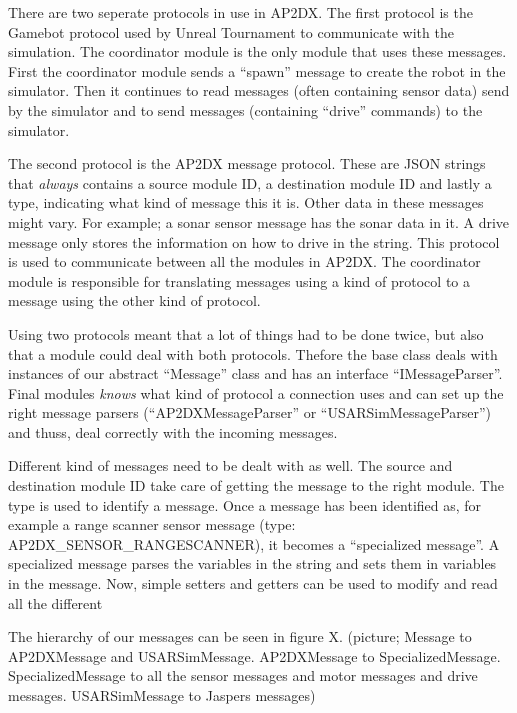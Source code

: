 There are two seperate protocols in use in AP2DX. The first protocol is the Gamebot protocol 
used by Unreal Tournament to communicate with the simulation. The coordinator module is the 
only module that uses these messages. First the coordinator module sends a ``spawn'' message 
to create the robot in the simulator. Then it continues to read messages (often containing 
sensor data) send by the simulator and to send messages (containing ``drive'' commands) to
the simulator. 

The second protocol is the AP2DX message protocol. These are JSON strings that \emph{always}
contains a source module ID, a destination module ID and lastly a type, indicating what kind
of message this it is. Other data in these messages might vary. For example; a sonar sensor
message has the sonar data in it. A drive message only stores the information on how to drive
in the string. 
This protocol is used to communicate between all the modules in 
AP2DX.  The coordinator module is responsible for translating messages using a kind of
protocol to a message using the other kind of protocol.

Using two protocols meant that a lot of things had to be done twice, but also that a module 
could deal with both protocols. Thefore the 
base class deals with instances
of our abstract ``Message'' class and has an interface ``IMessageParser''. Final modules \emph{knows}
what kind of protocol a connection uses and can set up the right message parsers (``AP2DXMessageParser'' 
or ``USARSimMessageParser'') and thuss, deal correctly with the incoming messages. 

Different kind of messages need to be dealt with as well. The source and destination module ID take care
of getting the message to the right module. The type is used to identify a message. Once a message
has been identified as, for example a range scanner sensor message (type: AP2DX\_SENSOR\_RANGESCANNER), 
it becomes a ``specialized message''. 
A specialized message parses the variables in the string and sets them in variables in the message. Now,
simple setters and getters can be used to modify and read all the different 

The hierarchy of our messages can be seen in figure X. 
(picture; Message to AP2DXMessage and USARSimMessage. AP2DXMessage to SpecializedMessage. SpecializedMessage
to all the sensor messages and motor messages and drive messages. USARSimMessage to Jaspers messages) 

